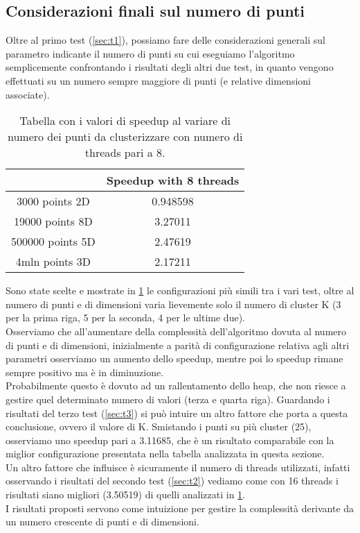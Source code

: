 \documentclass[10pt,twocolumn,letterpaper]{article}
\begin{document}
\subsection{Considerazioni finali sul numero di punti}
Oltre al primo test (\cref{sec:t1}), possiamo fare delle considerazioni generali sul parametro indicante il numero di punti su cui eseguiamo l'algoritmo semplicemente confrontando i risultati degli altri due test, in quanto vengono effettuati su un numero sempre maggiore di punti (e relative dimensioni associate).

\begin{table}[h]
\centering
\begin{tabular}{ |c|c| } 
\hline
 & Speedup with 8 threads \\
\hline
3000 points 2D & 0.948598\\
\hline
19000 points 8D & 3.27011\\
\hline
500000 points 5D & 2.47619\\
\hline
4mln points 3D & 2.17211\\
\hline
\end{tabular}
\vspace*{3mm}
\caption{Tabella con i valori di speedup al variare di numero dei punti da clusterizzare con numero di threads pari a 8.}
\label{table:t4}
\end{table}

Sono state scelte e mostrate in \cref{table:t4} le configurazioni più simili tra i vari test, oltre al numero di punti e di dimensioni varia lievemente solo il numero di cluster K (3 per la prima riga, 5 per la seconda, 4 per le ultime due).\\
Osserviamo che all'aumentare della complessità dell'algoritmo dovuta al numero di punti e di dimensioni, inizialmente a parità di configurazione relativa agli altri parametri osserviamo un aumento dello speedup, mentre poi lo speedup rimane sempre positivo ma è in diminuzione.\\
Probabilmente questo è dovuto ad un rallentamento dello heap, che non riesce a gestire quel determinato numero di valori (terza e quarta riga). Guardando i risultati del terzo test (\cref{sec:t3}) si può intuire un altro fattore che porta a questa conclusione, ovvero il valore di K. Smistando i punti su più cluster (25), osserviamo uno speedup pari a 3.11685, che è un risultato comparabile con la miglior configurazione presentata nella tabella analizzata in questa sezione. \\
Un altro fattore che influisce è sicuramente il numero di threads utilizzati, infatti osservando i risultati del secondo test (\cref{sec:t2}) vediamo come con 16 threads i risultati siano migliori (3.50519) di quelli analizzati in \cref{table:t4}.\\
I risultati proposti servono come intuizione per gestire la complessità derivante da un numero crescente di punti e di dimensioni.
\end{document}
